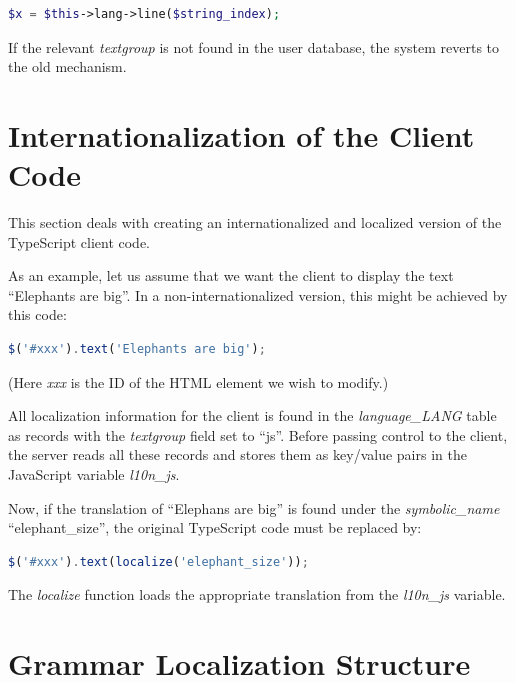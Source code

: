 \documentclass[11pt,oneside,a4paper]{memoir}
\begin{document}
\begin{lstlisting}[language=PHP]
$x = $this->lang->line($string_index);
\end{lstlisting}

If the relevant \emph{textgroup} is not found in the user database, the system reverts to the old
mechanism.




\section{Internationalization of the Client Code}\label{sec-localize-javascript}

This section deals with creating an internationalized and localized version of the TypeScript client
code.

As an example, let us assume that we want the client to display the text ``Elephants are big''. In a
non-internationalized version, this might be achieved by this code:

\begin{lstlisting}[language=TypeScript]
$('#xxx').text('Elephants are big');
\end{lstlisting}

(Here \emph{xxx} is the ID of the HTML element we wish to modify.)

All localization information for the client is found in the \emph{language\_LANG} table as records
with the \emph{textgroup} field set to ``js''. Before passing control to the client, the server
reads all these records and stores them as key/value pairs in the JavaScript variable
\emph{l10n\_js}.

Now, if the translation of ``Elephans are big'' is found under the \emph{symbolic\_name}
``elephant\_size'', the original TypeScript code must be replaced by:

\begin{lstlisting}[language=TypeScript]
$('#xxx').text(localize('elephant_size'));
\end{lstlisting}

The \emph{localize} function loads the appropriate translation from the \emph{l10n\_js} variable.


\section{Grammar Localization Structure}\label{sec-gram-loc-struct}
\end{document}
